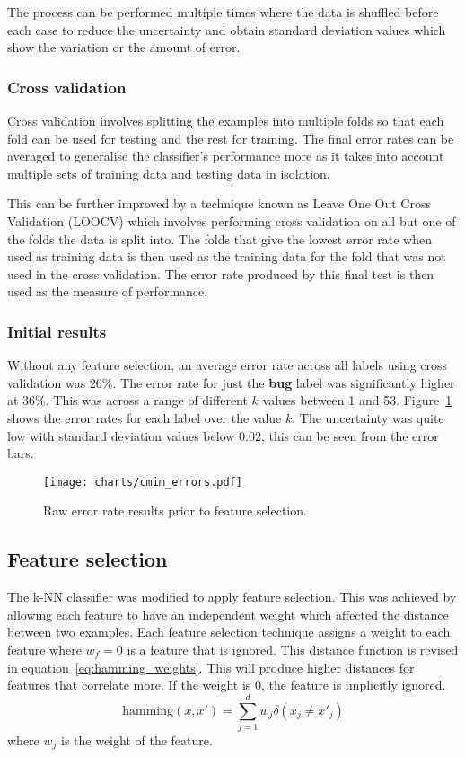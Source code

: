 The process can be performed multiple times where the data is shuffled before each case to reduce the uncertainty and obtain
standard deviation values which show the variation or the amount of error.

\subsubsection{Cross validation}
Cross validation involves splitting the examples into multiple folds so that each fold can be used for testing and the rest for
training. The final error rates can be averaged to generalise the classifier's performance more as it takes into account
multiple sets of training data and testing data in isolation.

This can be further improved by a technique known as Leave One Out Cross Validation (LOOCV) which involves performing cross
validation on all but one of the folds the data is split into. The folds that give the lowest error rate when used as training
data is then used as the training data for the fold that was not used in the cross validation. The error rate produced by this
final test is then used as the measure of performance.

\subsubsection{Initial results}
\label{sec:initial_results}
Without any feature selection, an average error rate across all labels using cross validation was 26\%. The error rate for just
the \textbf{bug} label was significantly higher at 36\%. This was across a range of different $k$ values between 1 and 53.
Figure~\ref{fig:raw_errors} shows the error rates for each label over the value $k$. The uncertainty was quite low with
standard deviation values below 0.02, this can be seen from the error bars.

\begin{figure}[h]
    \centering
    \texttt{[image: charts/cmim\_errors.pdf]}
    \caption{Raw error rate results prior to feature selection.}
    \label{fig:raw_errors}
\end{figure}

\subsection{Feature selection}
The k-NN classifier was modified to apply feature selection. This was achieved by allowing each feature to have an independent
weight which affected the distance between two examples. Each feature selection technique assigns a weight to each feature where
$w_f = 0$ is a feature that is ignored. This distance function is revised in equation~\ref{eq:hamming_weights}. This will
produce higher distances for features that correlate more. If the weight is 0, the feature is implicitly ignored.
\begin{equation}
    \label{eq:hamming_weights}
    \mathrm{hamming}(x,x') = \sum^d_{j=1} w_{j} \delta (x_{j} \neq x'_{j})
\end{equation}
where $w_{j}$ is the weight of the feature.

